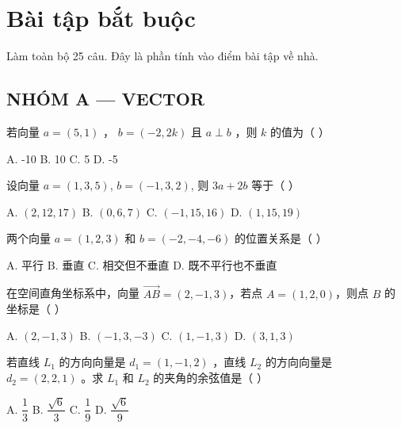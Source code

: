 \documentclass[11pt, a4paper]{article}
\begin{document}

\section{Bài tập bắt buộc}

Làm toàn bộ 25 câu. Đây là phần tính vào điểm bài tập về nhà.

\subsection*{NHÓM A — VECTOR}

\begin{baitap}[1]
若向量 $a = (5,1)$ ， $b = (-2,2k)$ 且 $a \perp b$ ，则 $k$ 的值为（ ）
\par\vspace{3pt}
\noindent A. -10 \quad B. 10 \quad C. 5 \quad D. -5
\end{baitap}

\begin{baitap}[2]
设向量 $a = (1,3,5)$, $b = (-1,3,2)$, 则 $3a + 2b$ 等于（ ）
\par\vspace{3pt}
\noindent A. $(2,12,17)$ \quad B. $(0,6,7)$ \quad C. $(-1,15,16)$ \quad D. $(1,15,19)$
\end{baitap}

\begin{baitap}[3]
两个向量 $a = (1,2,3)$ 和 $b = (-2,-4,-6)$ 的位置关系是（ ）
\par\vspace{3pt}
\noindent A. 平行 \quad B. 垂直 \quad C. 相交但不垂直 \quad D. 既不平行也不垂直
\end{baitap}

\begin{baitap}[4]
在空间直角坐标系中，向量 $\overrightarrow{AB} = (2,-1,3)$，若点 $A = (1,2,0)$，则点 $B$ 的坐标是（ ）
\par\vspace{3pt}
\noindent A. $(2,-1,3)$ \quad B. $(-1,3,-3)$ \quad C. $(1,-1,3)$ \quad D. $(3,1,3)$
\end{baitap}

\begin{baitap}[5]
若直线 $L_1$ 的方向向量是 $d_1 = (1,-1,2)$ ，直线 $L_2$ 的方向向量是 $d_2 = (2,2,1)$ 。求 $L_1$ 和 $L_2$ 的夹角的余弦值是（ ）
\par\vspace{3pt}
\noindent A. $\dfrac{1}{3}$ \quad B. $\dfrac{\sqrt{6}}{3}$ \quad C. $\dfrac{1}{9}$ \quad D. $\dfrac{\sqrt{6}}{9}$
\end{baitap}
\end{document}

